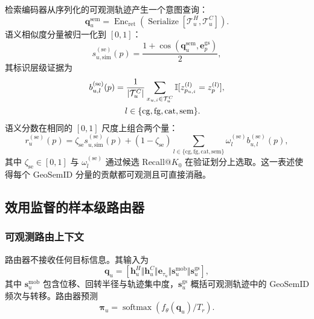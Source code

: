 \documentclass[10pt,fontset=none,twocolumn]{ctexart}
\newcommand{\Ind}{\mathbb{I}}
\begin{document}
检索编码器从序列化的可观测轨迹产生一个意图查询：
\begin{equation}
\bm{q}_{u}^{\mathrm{sem}}
=
\operatorname{Enc}_{\mathrm{ret}}
\left(
\operatorname{Serialize}
\left[\mathcal{T}_{u}^{H},\mathcal{T}_{u}^{C}\right]
\right).
\label{eq:semantic_query}
\end{equation}
语义相似度分量被归一化到 $[0,1]$：
\begin{equation}
s_{u,\mathrm{sim}}^{(\mathrm{se})}(p)
=
\frac{1+\operatorname{cos}\!\left(
\bm{q}_{u}^{\mathrm{sem}},\bm{e}_{p}^{\mathrm{gs}}
\right)}{2},
\label{eq:semantic_exact}
\end{equation}
其标识层级证据为
\begin{equation}
\begin{aligned}
b_{u,l}^{(\mathrm{se})}(p)
&=
\frac{1}{|\mathcal{T}_{u}^{C}|}
\sum_{x_{u,i}\in\mathcal{T}_{u}^{C}}
\Ind[z_{p_{u,i}}^{(l)}=z_p^{(l)}],\\
&\hspace{1.2em}
 l\in\{\mathrm{cg},\mathrm{fg},\mathrm{cat},\mathrm{sem}\}.
\end{aligned}
\label{eq:semantic_backoff}
\end{equation}
语义分数在相同的 $[0,1]$ 尺度上组合两个量：
\begin{equation}
r_u^{(\mathrm{se})}(p)
=
\zeta_{\mathrm{se}}s_{u,\mathrm{sim}}^{(\mathrm{se})}(p)
+
(1-\zeta_{\mathrm{se}})
\sum_{l\in\{\mathrm{cg},\mathrm{fg},\mathrm{cat},\mathrm{sem}\}}
\omega_l^{(\mathrm{se})}b_{u,l}^{(\mathrm{se})}(p),
\label{eq:semantic_fusion}
\end{equation}
其中 $\zeta_{\mathrm{se}}\in[0,1]$ 与 $\omega_l^{(\mathrm{se})}$ 通过候选 Recall@$K_0$ 在验证划分上选取。这一表述使得每个 GeoSemID 分量的贡献都可观测且可直接消融。

\subsection{效用监督的样本级路由器}
\label{subsec:router}

\subsubsection{可观测路由上下文}

路由器不接收任何目标信息。其输入为
\begin{equation}
\bm{q}_{u}
=
[
\bm{h}_{u}^{H}
\Vert
\bm{h}_{u}^{C}
\Vert
\bm{e}_{\tau_u}
\Vert
\bm{s}_{u}^{\mathrm{mob}}
\Vert
\bm{s}_{u}^{\mathrm{gs}}
],
\label{eq:routing_context}
\end{equation}
其中 $\bm{s}_{u}^{\mathrm{mob}}$ 包含位移、回转半径与轨迹集中度，$\bm{s}_{u}^{\mathrm{gs}}$ 概括可观测轨迹中的 GeoSemID 频次与转移。路由器预测
\begin{equation}
\bm{\pi}_{u}
=
\operatorname{softmax}(f_{\theta}(\bm{q}_{u})/T_r).
\label{eq:router_output}
\end{equation}
\end{document}
